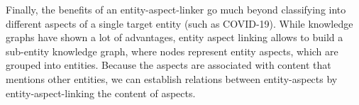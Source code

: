 Finally, the benefits of an entity-aspect-linker go much beyond classifying into different aspects of a single target entity (such as COVID-19). While knowledge graphs have shown a lot of advantages, entity aspect linking allows to build a sub-entity knowledge graph, where nodes represent entity aspects, which are grouped into entities. Because the aspects are associated with content that mentions other entities, we can establish relations between entity-aspects by entity-aspect-linking the content of aspects.





